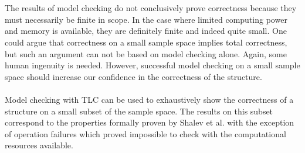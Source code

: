 \documentclass{uit-thesis}
\begin{document}
\\\\
The results of model checking do not conclusively prove correctness because they must necessarily be finite in scope. In the case where limited computing power and memory is available, they are definitely finite and indeed quite small. One could argue that correctness on a small sample space implies total correctness, but such an argument can not be based on model checking alone. Again, some human ingenuity is needed. However, successful model checking on a small sample space should increase our confidence in the correctness of the structure.
\\\\
Model checking with TLC can be used to exhaustively show the correctness of a structure on a small subset of the sample space. The results on this subset correspond to the properties formally proven by Shalev et al. with the exception of operation failures which proved impossible to check with the computational resources available.
\end{document}
